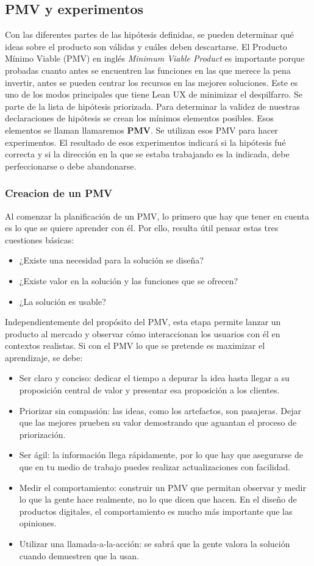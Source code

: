 \subsection{PMV y experimentos}
Con las diferentes partes de las hipótesis definidas, se pueden determinar qué ideas sobre el producto son válidas y cuáles deben descartarse. El Producto Mínimo Viable (PMV) en inglés \textit{Minimum Viable Product} es importante porque probadas cuanto antes se encuentren las funciones en las que merece la pena invertir, antes se pueden centrar los recursos en las mejores soluciones. Este es uno de los modos principales que tiene Lean UX de minimizar el despilfarro. Se parte de la lista de hipótesis priorizada. Para determinar la validez de nuestras declaraciones de hipótesis se crean los mínimos elementos posibles. Esos elementos se llaman llamaremos \textbf{PMV}. Se utilizan  esos PMV para hacer experimentos. El resultado de esos experimentos indicará si la hipótesis fué correcta y si la dirección en la que se estaba trabajando es la indicada, debe perfeccionarse o debe abandonarse.

\subsubsection{Creacion de un PMV}
Al comenzar la planificación de un PMV, lo primero que hay que tener en cuenta es lo que se quiere aprender con él. Por ello, resulta útil pensar estas tres cuestiones básicas: 
\begin{itemize}
    \item ¿Existe una necesidad para la solución se diseña? 
    \item ¿Existe valor en la solución y las funciones que se ofrecen?
    \item  ¿La solución es usable?
\end{itemize}

Independientemente del propósito del PMV, esta etapa permite lanzar un producto al mercado y observar cómo interaccionan los usuarios con él en contextos realistas. Si con el PMV lo que se pretende es maximizar el aprendizaje, se debe:
\begin{itemize}
    \item Ser claro y conciso: dedicar el tiempo a depurar la idea hasta llegar a su proposición central de valor y presentar esa proposición a los clientes. 
    \item Priorizar sin compasión: las ideas, como los artefactos, son pasajeras. Dejar que las mejores prueben su valor demostrando que aguantan el proceso de priorización. 
    \item Ser ágil: la información llega rápidamente, por lo que hay que asegurarse de que en tu medio de trabajo puedes realizar actualizaciones con facilidad. 
    \item Medir el comportamiento: construir un PMV que permitan observar y medir lo que la gente hace realmente, no lo que dicen que hacen. En el diseño de productos digitales, el comportamiento es mucho más importante que las opiniones. 
    \item Utilizar una llamada-a-la-acción: se sabrá que la gente valora la solución cuando demuestren que la usan.
\end{itemize}


